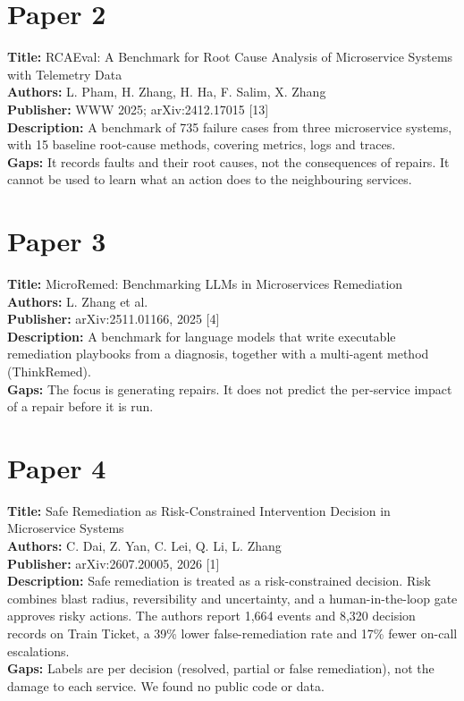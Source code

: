 \documentclass[12pt,a4paper]{report}
\begin{document}
\section{Paper 2}
\noindent\textbf{Title:} RCAEval: A Benchmark for Root Cause Analysis of Microservice Systems with Telemetry Data\\
\textbf{Authors:} L. Pham, H. Zhang, H. Ha, F. Salim, X. Zhang\\
\textbf{Publisher:} WWW 2025; arXiv:2412.17015 [13]\\
\textbf{Description:} A benchmark of 735 failure cases from three microservice systems, with 15 baseline root-cause methods, covering metrics, logs and traces.\\
\textbf{Gaps:} It records faults and their root causes, not the consequences of repairs. It cannot be used to learn what an action does to the neighbouring services.

\section{Paper 3}
\noindent\textbf{Title:} MicroRemed: Benchmarking LLMs in Microservices Remediation\\
\textbf{Authors:} L. Zhang et al.\\
\textbf{Publisher:} arXiv:2511.01166, 2025 [4]\\
\textbf{Description:} A benchmark for language models that write executable remediation playbooks from a diagnosis, together with a multi-agent method (ThinkRemed).\\
\textbf{Gaps:} The focus is generating repairs. It does not predict the per-service impact of a repair before it is run.

\section{Paper 4}
\noindent\textbf{Title:} Safe Remediation as Risk-Constrained Intervention Decision in Microservice Systems\\
\textbf{Authors:} C. Dai, Z. Yan, C. Lei, Q. Li, L. Zhang\\
\textbf{Publisher:} arXiv:2607.20005, 2026 [1]\\
\textbf{Description:} Safe remediation is treated as a risk-constrained decision. Risk combines blast radius, reversibility and uncertainty, and a human-in-the-loop gate approves risky actions. The authors report 1,664 events and 8,320 decision records on Train Ticket, a 39\% lower false-remediation rate and 17\% fewer on-call escalations.\\
\textbf{Gaps:} Labels are per decision (resolved, partial or false remediation), not the damage to each service. We found no public code or data.
\end{document}
